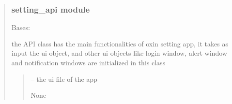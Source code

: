 \documentclass[letterpaper,10pt,english]{sphinxmanual}
\begin{document}
\begin{quote}
\begin{savenotes}
\begin{fulllineitems}
\begin{savenotes}
\begin{fulllineitems}
\begin{quote}
\begin{description}
\end{description}\end{quote}

\end{fulllineitems}\end{savenotes}


\end{fulllineitems}\end{savenotes}


\sphinxstepscope


\subsubsection{setting\_api module}
\label{\detokenize{setting/setting_api:module-oxin.setting_api}}\label{\detokenize{setting/setting_api:setting-api-module}}\label{\detokenize{setting/setting_api::doc}}

\begin{savenotes}\begin{fulllineitems}
\label{\detokenize{setting/setting_api:oxin.setting_api.API}}
\pysigstartsignatures
{}
\pysigstopsignatures
\sphinxAtStartPar
Bases: 

\sphinxAtStartPar
the API class has the main functionalities of oxin setting app, it takes as input the ui object, and other ui objects like login window,
alert window and notification windows are initialized in this class
\begin{quote}\begin{description}
\sphinxAtStartPar
{} – the ui file of the app

\sphinxAtStartPar
None

\end{description}\end{quote}


\end{fulllineitems}
\end{savenotes}
\end{quote}
\end{document}
